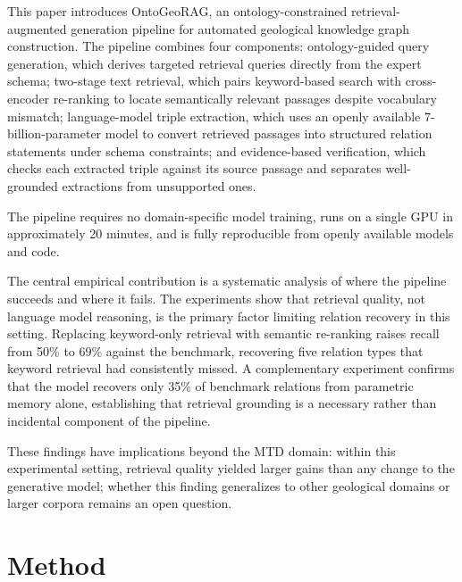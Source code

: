 \documentclass[10pt]{article}
\newcommand{\method}{OntoGeoRAG}
\begin{document}
This paper introduces \method{}, an ontology-constrained
retrieval-augmented generation pipeline for automated geological
knowledge graph construction. The pipeline combines four components:
ontology-guided query generation, which derives targeted retrieval
queries directly from the expert schema; two-stage text retrieval,
which pairs keyword-based search with cross-encoder re-ranking to
locate semantically relevant passages despite vocabulary mismatch;
language-model triple extraction, which uses an openly available
7-billion-parameter model to convert retrieved passages into
structured relation statements under schema constraints; and
evidence-based verification, which checks each extracted triple
against its source passage and separates well-grounded extractions
from unsupported ones.

The pipeline requires no domain-specific model training, runs on a
single GPU in approximately 20 minutes, and is fully reproducible
from openly available models and code.

The central empirical contribution is a systematic analysis of where
the pipeline succeeds and where it fails. The experiments show that
retrieval quality, not language model reasoning, is the primary
factor limiting relation recovery in this setting. Replacing
keyword-only retrieval with semantic re-ranking raises recall from
50\% to 69\% against the benchmark, recovering five relation types
that keyword retrieval had consistently missed. A complementary
experiment confirms that the model recovers only 35\% of benchmark
relations from parametric memory alone, establishing that retrieval
grounding is a necessary rather than incidental component of the
pipeline.

These findings have implications beyond the MTD domain: within this experimental setting, retrieval quality
yielded larger gains than any change to the generative
model; whether this finding generalizes to other geological
domains or larger corpora remains an open question.







\section{Method}
\label{sec:method}
\end{document}

